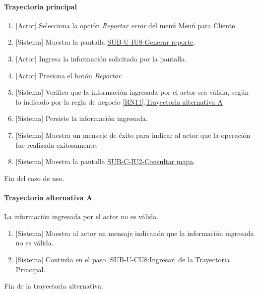 \paragraph{Trayectoria principal}
	\begin{enumerate}
		\item {[Actor]} Selecciona la opción \textit{Reportar error} del menú \hyperref[fig:menu-cliente]{Menú para Cliente}.
		\item {[Sistema]} Muestra la pantalla \hyperref[fig:sub-u-iu8]{SUB-U-IU8-Generar reporte}.
		\item \label{SUB-U-CU8:Ingresar} {[Actor]} Ingresa la información solicitada por la pantalla.
		\item {[Actor]} Presiona el botón \textit{Reportar}.
		\item {[Sistema]} Verifica que la información ingresada por el actor sea válida, según lo indicado por la regla de negocio \ref{RN11}.\hyperref[SUB-U-CU8:TA]{Trayectoria alternativa A}
		\item {[Sistema]} Persiste la información ingresada.
		\item {[Sistema]} Muestra un mensaje de éxito para indicar al actor que la operación fue realizada exitosamente.
		\item {[Sistema]} Muestra la pantalla \hyperref[fig:sub-c-iu2]{SUB-C-IU2-Consultar mapa}.
	\end{enumerate}
	Fin del caso de uso.

\paragraph{Trayectoria alternativa A} \label{SUB-U-CU8:TA}
	La información ingresada por el actor no es válida.
	\begin{enumerate}[label=A\arabic*.]
		\item {[Sistema]} Muestra al actor un mensaje indicando que la información ingresada no es válida.
		\item {[Sistema]} Continúa en el paso \ref{SUB-U-CU8:Ingresar} de la Trayectoria Principal.
	\end{enumerate}
	Fin de la trayectoria alternativa.

